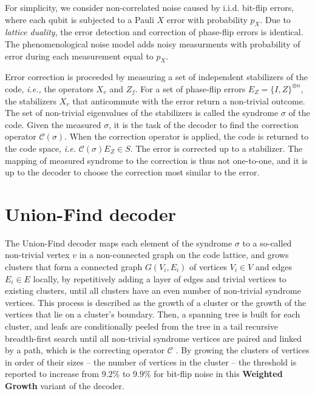 For simplicity, we consider non-correlated noise caused by i.i.d. bit-flip errors, where each qubit is subjected to a Pauli $X$ error with probability $p_X$. Due to \emph{lattice duality}, the error detection and correction of phase-flip errors is identical. The phenomenological noise model adds noisy measurments with probability of error during each measurement equal to $p_X$. 

Error correction is proceeded by measuring a set of independent stabilizers of the code, \emph{i.e.,} the operators $X_v$ and $Z_f$. For a set of phase-flip errors $E_Z = \{I,Z\}^{\otimes n}$, the stabilizers $X_v$ that anticommute with the error return a non-trivial outcome. The set of non-trivial eigenvalues of the stabilizers is called the syndrome $\sigma$ of the code. Given the measured $\sigma$, it is the task of the decoder to find the correction operator $\mathcal{C}(\sigma)$. When the correction operator is applied, the code is returned to the code space, \emph{i.e.} $\mathcal{C}(\sigma)E_Z \in S$. The error is corrected up to a stabilizer. The mapping of measured syndrome to the correction is thus not one-to-one, and it is up to the decoder to choose the correction most similar to the error. 

\section{Union-Find decoder}\label{sec:unionfind}

The Union-Find decoder \cite{delfosse2017almost} maps each element of the syndrome $\sigma$ to a so-called non-trivial vertex $v$ in a non-connected graph on the code lattice, and grows clusters that form a connected graph $G(V_i, E_i)$ of vertices $V_i\in V$ and edges $E_i \in E$ locally, by repetitively adding a layer of edges and trivial vertices to existing clusters, until all clusters have an even number of non-trivial syndrome vertices. This process is described as the growth of a cluster or the growth of the vertices that lie on a cluster's boundary. Then, a spanning tree is built for each cluster, and leafs are conditionally peeled from the tree in a tail recursive breadth-first search until all non-trivial syndrome vertices are paired and linked by a path, which is the correcting operator $\mathcal{C}$ \cite{delfosse2017linear}. By growing the clusters of vertices in order of their sizes -- the number of vertices in the cluster -- the threshold is reported to increase from $9.2\%$ to $9.9\%$ for bit-flip noise in this \textbf{Weighted Growth} variant of the decoder.

